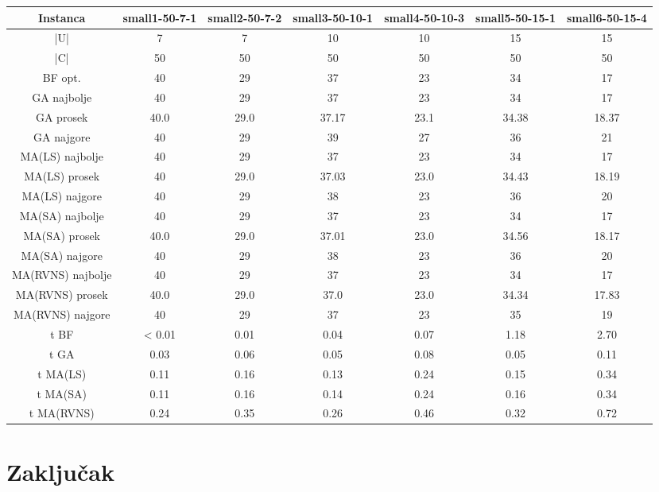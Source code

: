 \documentclass[12pt, a4paper]{article}
\theoremstyle{definition}
\begin{document}
\begin{table}
\begin{adjustbox}{width=\columnwidth,center}
\begin{tabular}{ |c|c|c|c|c|c|c| }
\hline
Instanca & small1-50-7-1 & small2-50-7-2 & small3-50-10-1 & small4-50-10-3 & small5-50-15-1 & small6-50-15-4 \\
\hline
|U| & 7 & 7 & 10 & 10 & 15 & 15 \\
\hline
|C| & 50 & 50 & 50 & 50 & 50 & 50 \\
\hline
BF opt. & 40 & 29 & 37 & 23 & 34 & 17 \\
\hline
GA najbolje & 40 & 29 & 37 & 23 & 34 & 17 \\
\hline
GA prosek & 40.0 & 29.0 & 37.17 & 23.1 & 34.38 & 18.37 \\
\hline
GA najgore & 40 & 29 & 39 & 27 & 36 & 21 \\
\hline
MA(LS) najbolje & 40 & 29 & 37 & 23 & 34 & 17 \\
\hline
MA(LS) prosek & 40 & 29.0 & 37.03 & 23.0 & 34.43 & 18.19 \\
\hline
MA(LS) najgore & 40 & 29 & 38 & 23 & 36 & 20 \\
\hline
MA(SA) najbolje & 40 & 29 & 37 & 23 & 34 & 17 \\
\hline
MA(SA) prosek & 40.0 & 29.0 & 37.01 & 23.0 & 34.56 & 18.17 \\
\hline
MA(SA) najgore & 40 & 29 & 38 & 23 & 36 & 20 \\
\hline
MA(RVNS) najbolje & 40 & 29 & 37 & 23 & 34 & 17 \\
\hline
MA(RVNS) prosek & 40.0 & 29.0 & 37.0 & 23.0 & 34.34 & 17.83 \\
\hline
MA(RVNS) najgore & 40 & 29 & 37 & 23 & 35 & 19 \\
\hline
t BF & < 0.01 & 0.01 & 0.04 & 0.07 & 1.18 & 2.70 \\
\hline
t GA & 0.03 & 0.06 & 0.05 & 0.08 & 0.05 & 0.11 \\
\hline
t MA(LS) & 0.11 & 0.16 & 0.13 & 0.24 & 0.15 & 0.34 \\
\hline
t MA(SA) & 0.11 & 0.16 & 0.14 & 0.24 & 0.16 & 0.34 \\
\hline
t MA(RVNS) & 0.24 & 0.35 & 0.26 & 0.46 & 0.32 & 0.72 \\
\hline
\end{tabular}
\end{adjustbox}
\end{table}

\section{Zaključak}
\end{document}
